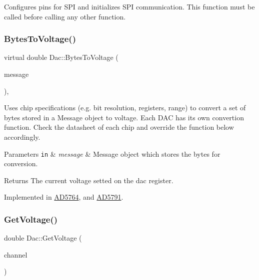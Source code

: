 Configures pins for S\+PI and initializes S\+PI communication. This function must be called before calling any other function. \mbox{\label{classDac_a1df39dc8c6e5b50afd07b6dd8a6b9300}} 
\subsubsection{\texorpdfstring{Bytes\+To\+Voltage()}{BytesToVoltage()}}
{\footnotesize\ttfamily virtual double Dac\+::\+Bytes\+To\+Voltage (\begin{DoxyParamCaption}\item[{\mbox{\hyperlink{structspi__utils_1_1Message}{spi\+\_\+utils\+::\+Message}}}]{message }\end{DoxyParamCaption})\hspace{0.3cm}{\ttfamily [protected]}, {}}

Uses chip specifications (e.\+g. bit resolution, registers, range) to convert a set of bytes stored in a Message object to voltage. Each D\+AC has its own convertion function. Check the datasheet of each chip and override the function below accordingly. 
\begin{DoxyParams}[1]{Parameters}
\mbox{\tt in}  & {\em message} & Message object which stores the bytes for conversion. \\
\hline
\end{DoxyParams}
\begin{DoxyReturn}{Returns}
The current voltage setted on the dac register. 
\end{DoxyReturn}


Implemented in \mbox{\hyperlink{classAD5764_a729015992eda059ae615373d1db53823}{A\+D5764}}, and \mbox{\hyperlink{classAD5791_ab1f3eef8afe6989d9981bb29ddec9ec5}{A\+D5791}}.

\mbox{\label{classDac_ad51bf5450f03f39a0357398af69f1705}} 
\subsubsection{\texorpdfstring{Get\+Voltage()}{GetVoltage()}}
{\footnotesize\ttfamily double Dac\+::\+Get\+Voltage (\begin{DoxyParamCaption}\item[{uint8\+\_\+t}]{channel }\end{DoxyParamCaption})}

